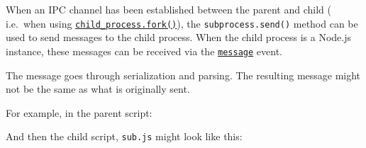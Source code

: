 When an IPC channel has been established between the parent and child (
i.e.~when using
\hyperref[child_processforkmodulepath-args-options]{\texttt{child\_process.fork()}}),
the \texttt{subprocess.send()} method can be used to send messages to
the child process. When the child process is a Node.js instance, these
messages can be received via the
\href{process.md\#event-message}{\texttt{\textquotesingle{}message\textquotesingle{}}}
event.

The message goes through serialization and parsing. The resulting
message might not be the same as what is originally sent.

For example, in the parent script:

\begin{Shaded}
\begin{Highlighting}[]
\OperatorTok{=} \NormalTok{(}\NormalTok{)}\OperatorTok{;}
\OperatorTok{=}\NormalTok{(}\VerbatimStringTok{\textasciigrave{}}\SpecialCharTok{$\{}\SpecialCharTok{\}}\NormalTok{)}\OperatorTok{;}

\NormalTok{(}\OperatorTok{,}\KeywordTok{=\textgreater{}}\NormalTok{ \{}
  \NormalTok{(}\OperatorTok{,}\OperatorTok{;}
\NormalTok{\})}\OperatorTok{;}

\NormalTok{(\{ }\OperatorTok{:} \NormalTok{ \})}\OperatorTok{;}
\end{Highlighting}
\end{Shaded}

And then the child script,
\texttt{\textquotesingle{}sub.js\textquotesingle{}} might look like
this:


